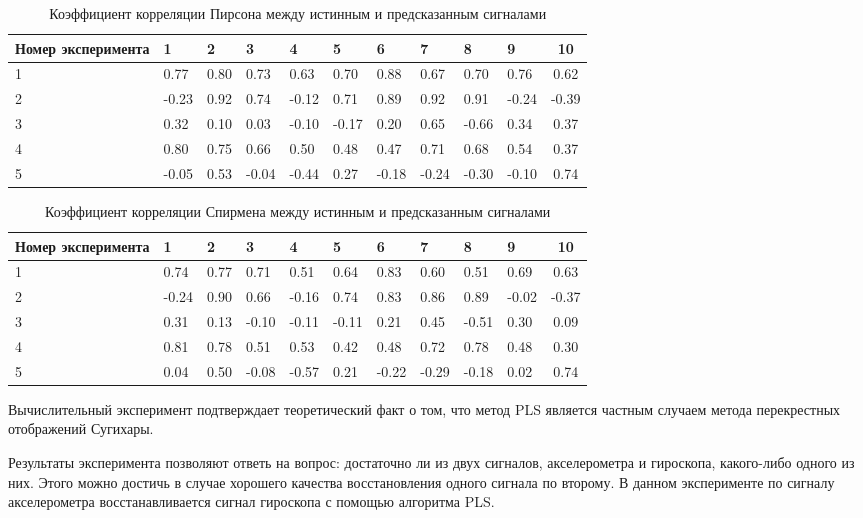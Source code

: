 \documentclass[12pt]{extarticle}
\begin{document}
\begin{table}[bhtp]
	\centering
	\caption{Коэффициент корреляции Пирсона между истинным и предсказанным сигналами}
	\label{tbl:methods}
	\begin{tabular}{l|l|l|l|l|l|l|l|l|l|c}
		\hline
		Номер эксперимента & 1 & 2 &  3 &  4 & 5 &  6 &  7 & 8 &  9 & 10 \\
		\hline
	    1 & 0.77 & 0.80 & 0.73 & 0.63 & 0.70 & 0.88 & 0.67 & 0.70 & 0.76 & 0.62 \\
		2 & -0.23 & 0.92 & 0.74 & -0.12  & 0.71 & 0.89 & 0.92 & 0.91 & -0.24 & -0.39  \\
		3 & 0.32 & 0.10 & 0.03 & -0.10 & -0.17 & 0.20 & 0.65 & -0.66 & 0.34 & 0.37 \\
		4 & 0.80 & 0.75 & 0.66 & 0.50 & 0.48 & 0.47 & 0.71 & 0.68 & 0.54 & 0.37  \\
		5 & -0.05 & 0.53 & -0.04 & -0.44 & 0.27 & -0.18 & -0.24 & -0.30 & -0.10 & 0.74  \\
		\hline   
	\end{tabular}
\end{table}

\begin{table}[bhtp]
	\centering
	\caption{Коэффициент корреляции Спирмена между истинным и предсказанным сигналами}
	\label{tbl:methods}
	\begin{tabular}{l|l|l|l|l|l|l|l|l|l|c}
		\hline
		Номер эксперимента & 1 & 2 &  3 &  4 & 5 &  6 &  7 & 8 &  9 & 10 \\
		\hline
	    1 & 0.74 & 0.77 & 0.71 & 0.51 & 0.64 & 0.83 & 0.60 & 0.51 & 0.69 & 0.63 \\
		2 & -0.24 & 0.90 & 0.66 & -0.16  & 0.74 & 0.83 & 0.86 & 0.89 & -0.02 & -0.37  \\
		3 & 0.31 & 0.13 & -0.10 & -0.11 & -0.11 & 0.21 & 0.45 & -0.51 & 0.30 & 0.09 \\
		4 & 0.81 & 0.78 & 0.51 & 0.53 & 0.42 & 0.48 & 0.72 & 0.78 & 0.48 & 0.30  \\
		5 & 0.04 & 0.50 & -0.08 & -0.57 & 0.21 & -0.22 & -0.29 & -0.18 & 0.02 & 0.74  \\
		\hline   
	\end{tabular}
\end{table}

Вычислительный эксперимент подтверждает теоретический факт о том, что метод PLS является частным случаем метода перекрестных отображений Сугихары. 

Результаты эксперимента позволяют ответь на вопрос: достаточно ли из двух сигналов, акселерометра и гироскопа, какого-либо одного из них. Этого можно достичь в случае хорошего качества восстановления одного сигнала по второму. В данном эксперименте по сигналу акселерометра восстанавливается сигнал гироскопа с помощью алгоритма PLS.
\end{document}
